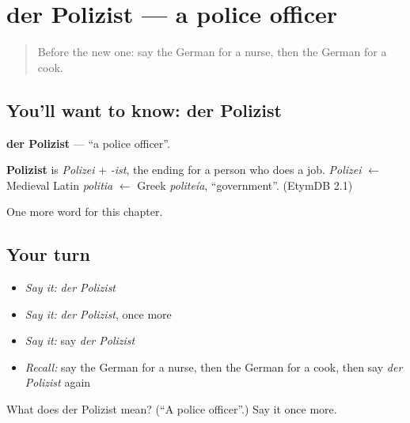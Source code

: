 \section[der Polizist]{der Polizist — a police officer}

\label{lesson:GE-C124-polizist}



\begin{quote}
Before the new one: say the German for a nurse, then the German for a cook.
\end{quote}

\subsection*{You'll want to know: der Polizist}
\textbf{der Polizist} — \textquotedblleft{}a police officer\textquotedblright{}.

\begin{cousinweb}
\textbf{Polizist} is \emph{Polizei} + \emph{-ist}, the ending for a person who does a job. \emph{Polizei} $\leftarrow$ Medieval Latin \emph{politia} $\leftarrow$ Greek \emph{politeía}, \textquotedblleft{}government\textquotedblright{}. (EtymDB 2.1)
\end{cousinweb}

\begin{grammarlens}[title={What you've built}]
One more word for this chapter.
\end{grammarlens}

\subsection*{Your turn}
\begin{itemize}
\raggedright
  \item \emph{Say it:} \emph{der Polizist}
  \item \emph{Say it:} \emph{der Polizist}, once more
  \item \emph{Say it:} say \emph{der Polizist}
  \item \emph{Recall:} say the German for a nurse, then the German for a cook, then say \emph{der Polizist} again
\end{itemize}

\begin{tcolorbox}[breakable,colback=teal!4,colframe=teal!35!black,title={Before you move on}]
What does der Polizist mean? (\textquotedblleft{}A police officer\textquotedblright{}.) Say it once more.
\end{tcolorbox}
